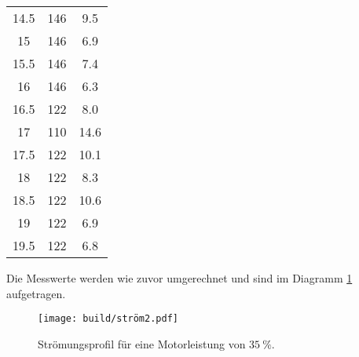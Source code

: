 \begin{table}
\begin{tabular}{S[table-format=2.1] S[table-format=3.0] S[table-format=2.1]}
14.5 & 146  & 9.5 \\
15   & 146  & 6.9 \\
15.5 & 146  & 7.4 \\
16   & 146  & 6.3 \\
16.5 & 122  & 8.0 \\
17   & 110  & 14.6 \\
17.5 & 122  & 10.1 \\
18   & 122  & 8.3 \\
18.5 & 122  & 10.6 \\
19   & 122  & 6.9 \\
19.5 & 122  & 6.8 \\
        \bottomrule
    \end{tabular}
\end{table}
\noindent
Die Messwerte werden wie zuvor umgerechnet und sind im Diagramm \ref{ström2fig} aufgetragen.
\begin{figure}[H]
  \centering
  \texttt{[image: build/ström2.pdf]}
  \caption{Strömungsprofil für eine Motorleistung von $\SI{35}{\percent}$.}
  \label{ström2fig}
\end{figure}
